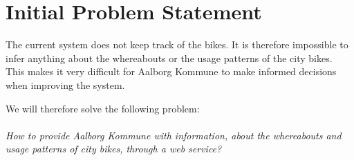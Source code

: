 \section*{Initial Problem Statement}

The current system does not keep track of the bikes. It is therefore impossible to infer anything about the whereabouts or the usage patterns of the city bikes.
This makes it very difficult for Aalborg Kommune to make informed decisions when improving the system. 

We will therefore solve the following problem:\\\\
\textit{How to provide Aalborg Kommune with information, about the whereabouts and usage patterns of city bikes, through a web service?}


%
%
%

